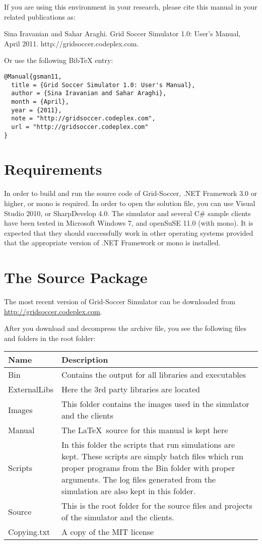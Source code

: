 \documentclass[12pt,titlepage,a4paper]{article}
\begin{document}
If you are using this environment in your research, please cite this manual in your related publications as:

\textsf{Sina Iravanian and Sahar Araghi. Grid Soccer Simulator 1.0: User's Manual, April 2011. http://gridsoccer.codeplex.com.}

Or use the following BibTeX entry:
{\small
\begin{verbatim}
@Manual{gsman11,
  title = {Grid Soccer Simulator 1.0: User's Manual},
  author = {Sina Iravanian and Sahar Araghi},
  month = {April},
  year = {2011},
  note = "http://gridsoccer.codeplex.com",
  url = "http://gridsoccer.codeplex.com"
}
\end{verbatim}
}

\section{Requirements}

In order to build and run the source code of Grid-Soccer, .NET Framework 3.0 or higher, or mono is required. In order to open the solution file, you can use Visual Studio 2010, or SharpDevelop 4.0. The simulator and several C\# sample clients have been tested in Microsoft Windows 7, and openSuSE 11.0 (with mono). It is expected that they should successfully work in other operating systems provided that the appropriate version of .NET Framework or mono is installed.

\section{The Source Package}

The most recent version of Grid-Soccer Simulator can be downloaded from
\href{http://gridsoccer.codeplex.com}{http://gridsoccer.codeplex.com}.

After you download and decompress the archive file, you see the following files and folders in the root folder:
\vspace{1cm}

\begin{tabular}{l|p{9cm}}
Name & Description \\ \hline
Bin & Contains the output for all libraries and executables \\
ExternalLibs & Here the 3rd party libraries are located \\
Images & This folder contains the images used in the simulator and the clients \\
Manual & The \LaTeX\ source for this manual is kept here \\
Scripts & In this folder the scripts that run simulations are kept. These scripts are simply batch files which run proper programs from the Bin folder with proper arguments. The log files generated from the simulation are also kept in this folder. \\
Source & This is the root folder for the source files and projects of the simulator and the clients. \\
Copying.txt & A copy of the MIT license
\end{tabular}
\vspace{1cm}
\end{document}
